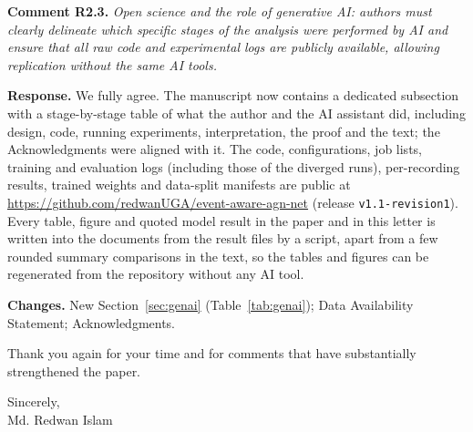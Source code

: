 \documentclass[11pt]{article}
\newcommand{\rc}[2]{\par\medskip\noindent\colorbox{black!6}{\parbox{\dimexpr\linewidth-2\fboxsep}{\textbf{Comment #1.} \itshape #2}}\par}
\newcommand{\resp}{\par\noindent\textbf{Response.} }
\newcommand{\chg}{\par\noindent\textbf{Changes.} }
\begin{document}
\rc{R2.3}{Open science and the role of generative AI: authors must clearly delineate which specific stages of the analysis were performed by AI and ensure that all raw code and experimental logs are publicly available, allowing replication without the same AI tools.}
\resp We fully agree. The manuscript now contains a dedicated subsection with a stage-by-stage table of what the author and the AI assistant did, including design, code, running experiments, interpretation, the proof and the text; the Acknowledgments were aligned with it. The code, configurations, job lists, training and evaluation logs (including those of the diverged runs), per-recording results, trained weights and data-split manifests are public at \url{https://github.com/redwanUGA/event-aware-agn-net} (release \texttt{v1.1-revision1}). Every table, figure and quoted model result in the paper and in this letter is written into the documents from the result files by a script, apart from a few rounded summary comparisons in the text, so the tables and figures can be regenerated from the repository without any AI tool.
\chg New Section~\ref{sec:genai} (Table~\ref{tab:genai}); Data Availability Statement; Acknowledgments.

\bigskip
Thank you again for your time and for comments that have substantially strengthened the paper.

Sincerely,\\
Md. Redwan Islam
\end{document}
